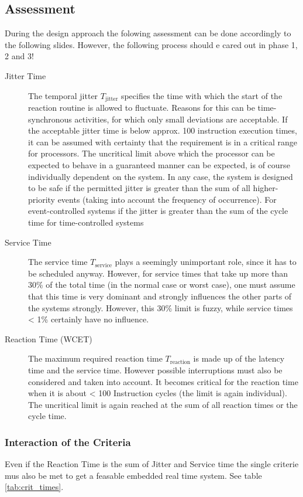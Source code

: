 \subsection{Assessment}
During the design approach the folowing assessment can be done accordingly to the following slides.
However, the following process should e cared out in phase 1, 2 and 3!
\begin{description}
	\item[Jitter Time] The temporal jitter $T_\text{jitter}$ specifies the time with which the start of the reaction routine is allowed to fluctuate.
	      Reasons for this can be time-synchronous activities, for which only small deviations are acceptable.
	      If the acceptable jitter time is below approx. 100 instruction execution times, it can be assumed with certainty that the requirement is in a critical range for processors.
	      The uncritical limit above which the processor can be expected to behave in a guaranteed manner can be expected, is of course individually dependent on the system.
	      In any case, the system is designed to be safe if the permitted jitter is greater than the sum of all higher-priority events (taking into account the frequency of occurrence).
	      For event-controlled systems if the jitter is greater than the sum of the cycle time for time-controlled systems
	\item[Service Time] The service time $T_\text{service}$ plays a seemingly unimportant role, since it has to be scheduled anyway.
	      However, for service times that take up more than 30\% of the total time (in the normal case or worst case), one must assume that this time is very dominant and strongly influences the other parts of the
	      systems strongly. However, this 30\% limit is fuzzy, while service times < 1\% certainly have no influence.
	\item[Reaction Time (WCET)] The maximum required reaction time $T_\text{reaction}$ is made up of the latency time and the service time.
	      However possible interruptions must also be considered and taken into account.
	      It becomes critical for the reaction time when it is about < 100 Instruction cycles (the limit is again	individual).
	      The uncritical limit is again reached at the sum of all reaction times or the cycle time.
\end{description}

\subsubsection{Interaction of the Criteria}
Even if the Reaction Time is the sum of Jitter and Service time the single criterie mus also be met to get a feasable embedded real time system. See table \ref{tab:crit_times}.

